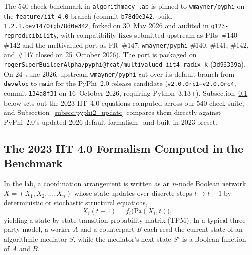 \documentclass[11pt,a4paper]{article}
\begin{document}
The 540-check benchmark in \texttt{algorithmacy-lab} is pinned to \texttt{wmayner/pyphi} on the \texttt{feature/iit-4.0} branch (commit \texttt{b78d0e342}, build \texttt{1.2.1.dev1470+gb78d0e342}, forked on 30~May 2026 and audited in \texttt{q123-reproducibility}, with compatibility fixes submitted upstream as PRs~\#140--\#142 and the multivalued port as PR~\#147; \texttt{wmayner/pyphi} \#140, \#141, \#142, and \#147 closed on 25~October 2026). The port is packaged on \texttt{rogerSuperBuilderAlpha/pyphi@feat/multivalued-iit4-radix-k} (\texttt{3d96339a}). On 24~June 2026, upstream \texttt{wmayner/pyphi} cut over its default branch from \texttt{develop} to \texttt{main} for the PyPhi~2.0 release candidate (\texttt{v2.0.0rc1}--\texttt{v2.0.0rc4}, commit \texttt{134a8f31} on 16~October 2026, requiring Python~3.13+). Subsection~\ref{subsec:iit4_2023} below sets out the 2023 IIT~4.0 equations computed across our 540-check suite, and Subsection~\ref{subsec:pyphi2_update} compares them directly against PyPhi~2.0's updated 2026 default formalism~\cite{mayner2026intrinsic} and built-in 2023 preset.

\subsection{The 2023 IIT 4.0 Formalism Computed in the Benchmark}
\label{subsec:iit4_2023}

In the lab, a coordination arrangement is written as an $n$-node Boolean network $X = (X_1, X_2, \dots, X_n)$ whose state updates over discrete steps $t \to t+1$ by deterministic or stochastic structural equations,
\begin{equation}
  X_i(t+1) = f_i\bigl(\mathrm{Pa}(X_i, t)\bigr),
\end{equation}
yielding a state-by-state transition probability matrix (TPM). In a typical three-party model, a worker $A$ and a counterpart $B$ each read the current state of an algorithmic mediator $S$, while the mediator's next state $S'$ is a Boolean function of $A$ and $B$.
\end{document}
